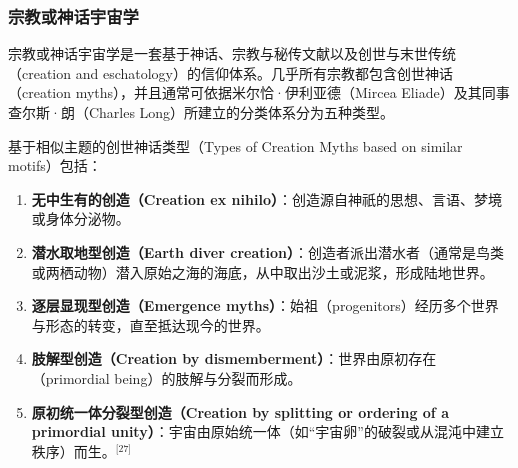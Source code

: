 \subsubsection{宗教或神话宇宙学}
宗教或神话宇宙学是一套基于神话、宗教与秘传文献以及创世与末世传统（creation and eschatology）的信仰体系。几乎所有宗教都包含创世神话（creation myths），并且通常可依据米尔恰·伊利亚德（Mircea Eliade）及其同事查尔斯·朗（Charles Long）所建立的分类体系分为五种类型。

基于相似主题的创世神话类型（Types of Creation Myths based on similar motifs）包括：
\begin{enumerate}
    \item \textbf{无中生有的创造（Creation ex nihilo）}：创造源自神祇的思想、言语、梦境或身体分泌物。
    \item \textbf{潜水取地型创造（Earth diver creation）}：创造者派出潜水者（通常是鸟类或两栖动物）潜入原始之海的海底，从中取出沙土或泥浆，形成陆地世界。
    \item \textbf{逐层显现型创造（Emergence myths）}：始祖（progenitors）经历多个世界与形态的转变，直至抵达现今的世界。
    \item \textbf{肢解型创造（Creation by dismemberment）}：世界由原初存在（primordial being）的肢解与分裂而形成。
    \item \textbf{原初统一体分裂型创造（Creation by splitting or ordering of a primordial unity）}：宇宙由原始统一体（如“宇宙卵”的破裂或从混沌中建立秩序）而生。\(^\text{[27]}\)
\end{enumerate}
